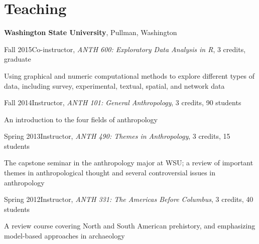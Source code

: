 \section{Teaching}

{\bf Washington State University}, Pullman, Washington
\begin{list1}
\item[] Fall 2015\hspace{.2cm}Co-instructor, \emph{ANTH 600: Exploratory Data Analysis in R}, 3 credits, graduate
\begin{list2}
\item[] Using graphical and numeric computational methods to explore different types of data, including survey, experimental, textual, spatial, and network data
\end{list2}

\vspace{0.1in}

\item[] Fall 2014\hspace{.2cm}Instructor, \emph{ANTH 101: General Anthropology}, 3 credits, 90 students
\begin{list2}
\item[] An introduction to the four fields of anthropology
\end{list2}

\vspace{0.1in}

\item[] Spring 2013\hspace{.2cm}Instructor, \emph{ANTH 490: Themes in Anthropology}, 3 credits, 15 students
\begin{list2}
\item[] The capstone seminar in the anthropology major at WSU; a review of important themes in anthropological thought and several controversial issues in anthropology
\end{list2}

\vspace{0.1in}

\item[] Spring 2012\hspace{.2cm}Instructor, \emph{ANTH 331: The Americas Before Columbus}, 3 credits, 40 students 
\begin{list2}
\item[] A review course covering North and South American prehistory, and emphasizing model-based approaches in archaeology
\end{list2}
\end{list1}


